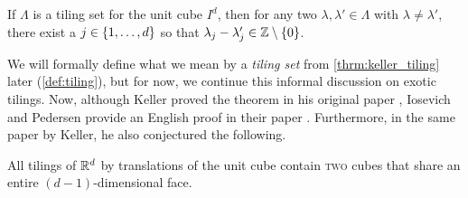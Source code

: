 \documentclass[../thesis.tex]{subfiles}
\begin{document}
\begin{theorem}\label{thrm:keller_tiling}
    If $\Lambda$ is a tiling set for the unit cube $I^d$, then for any two $\lambda, \lambda' \in \Lambda$ with $\lambda\neq\lambda'$, there exist a $j\in \{1,\dots,d\}$ so that $\lambda_j-\lambda_j' \in \mathbb{Z}\setminus\{0\}$.
\end{theorem}

We will formally define what we mean by a \emph{tiling set} from \cref{thrm:keller_tiling} later (\cref{def:tiling}), but for now, we continue this informal discussion on exotic tilings. Now, although Keller proved the theorem in his original paper \cite{kellerUberLuckenloseErfullung1930}, Iosevich and Pedersen provide an English proof in their paper \cite{iosevichSpectralTilingProperties1998}. Furthermore, in the same paper by Keller, he also conjectured the following. 

\begin{conjecture}\label{conj:keller_tiling}
    All tilings of $\mathbb{R}^d$ by translations of the unit cube contain \textsc{two} cubes that share an entire $(d-1)$-dimensional face.
\end{conjecture}  %


\end{document}
